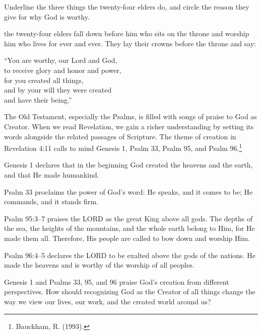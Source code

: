 \begin{ScriptureBox2}{Underline the three things the twenty-four elders do, and circle the reason they give for why God is worthy.}

\item[4:10] the twenty-four elders fall down before him who sits on the throne and worship him who lives for ever and ever. They lay their crowns before the throne and say:

\item[4:11] \hspace*{1.5em}``You are worthy, our Lord and God,\\
\hspace*{1.5em}to receive glory and honor and power,\\
\hspace*{1.5em}for you created all things,\\
\hspace*{1.5em}and by your will they were created\\
\hspace*{1.5em}and have their being.''

\end{ScriptureBox2}



The Old Testament, especially the Psalms, is filled with songs of praise to God as Creator. When we read Revelation, we gain a richer understanding by setting its words alongside the related passages of Scripture. The theme of creation in Revelation 4:11 calls to mind Genesis 1, Psalm 33, Psalm 95, and Psalm 96.\footnote{Bauckham, R. (1993).}

Genesis 1 declares that in the beginning God created the heavens and the earth, and that He made humankind.

Psalm 33 proclaims the power of God's word: He speaks, and it comes to be; He commands, and it stands firm.

Psalm 95:3--7 praises the LORD as the great King above all gods. The depths of the sea, the heights of the mountains, and the whole earth belong to Him, for He made them all. Therefore, His people are called to bow down and worship Him.

Psalm 96:4--5 declares the LORD to be exalted above the gods of the nations. He made the heavens and is worthy of the worship of all peoples.


\begin{ReaderQuestion}
Genesis 1 and Psalms 33, 95, and 96 praise God's creation from different perspectives. How should recognizing God as the Creator of all things change the way we view our lives, our work, and the created world around us?
\end{ReaderQuestion}

